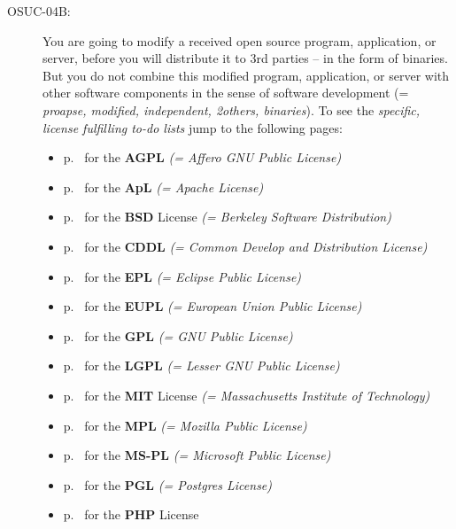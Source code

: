 \begin{description}
\item[OSUC-04B:]\label{OSUC-04B-DEF} You are going to modify a received open
source program, application, or server, before you will distribute it to 3rd
parties -- in the form of binaries. But you do not combine this modified
program, application, or server with other software components in the sense of
software development (= \textit{proapse, modified, independent, 2others,
binaries}). To see the \textit{specific, license fulfilling to-do lists} jump to
the following pages:
  \begin{itemize}
    \item p.\ \pageref{OSUC-04B-AGPL} for the \textbf{AGPL}
      \textit{(= Affero GNU Public License)} 
    \item p.\ \pageref{OSUC-04B-Apache20} for the \textbf{ApL}
      \textit{(= Apache License)}
    \item p.\ \pageref{OSUC-04B-BSD} for the \textbf{BSD} License
      \textit{(= Berkeley Software Distribution)}
    \item p.\ \pageref{OSUC-04B-CDDL} for the \textbf{CDDL}
      \textit{(= Common Develop and Distribution License)}  
    \item p.\ \pageref{OSUC-04B-EPL} for the \textbf{EPL}
      \textit{(= Eclipse Public License)}     
    \item p.\ \pageref{OSUC-04B-EUPL} for the \textbf{EUPL}
      \textit{(= European Union Public License)} 
    \item p.\ \pageref{OSUC-04B-GPL} for the \textbf{GPL}
       \textit{(= GNU Public License)} 
    \item p.\ \pageref{OSUC-04B-LGPL} for the \textbf{LGPL}
      \textit{(= Lesser GNU Public License)}           
    \item p.\ \pageref{OSUC-04B-MIT} for the \textbf{MIT} License
       \textit{(= Massachusetts Institute of Technology)} 
    \item p.\ \pageref{OSUC-04B-MPL} for the \textbf{MPL}
      \textit{(= Mozilla Public License)}     
    \item p.\ \pageref{OSUC-04B-MS-PL} for the \textbf{MS-PL}
      \textit{(= Microsoft Public License)} 
    \item p.\ \pageref{OSUC-04B-PGL} for the \textbf{PGL}
      \textit{(= Postgres License)} 
    \item p.\ \pageref{OSUC-04B-PHP} for the \textbf{PHP} License 
  \end{itemize}



\end{description}

